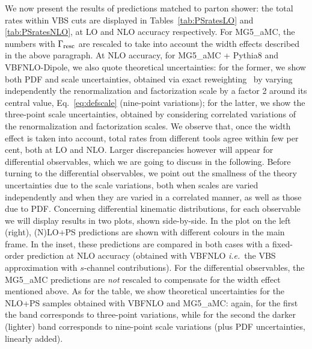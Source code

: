 We now present the results of predictions matched to parton shower: the total rates within VBS cuts are displayed in Tables~\ref{tab:PSratesLO} and
\ref{tab:PSratesNLO}, at LO and NLO
accuracy respectively. For {\sc MG5\_aMC}, 
the numbers with $\Gamma_{\rm resc}$ are rescaled to 
take into account the width effects described in the above paragraph. At NLO accuracy, for {\sc MG5\_aMC} + {\sc Pythia8} and {\sc VBFNLO}-{\sc Dipole}, we also quote
theoretical uncertainties: for the former, we show both PDF and scale uncertainties, obtained via exact reweighting~\cite{Frederix:2011ss} by varying independently the renormalization and factorization
scale by a factor 2 around its central value, Eq.~\ref{eq:defscale} (nine-point variations); for the latter, we show the 
three-point scale uncertainties, obtained by considering correlated variations of the renormalization and factorization scales. 
We observe that, once the width effect is taken into
account, total rates from different tools agree within few per cent, both at LO and NLO. Larger discrepancies however will appear for differential observables, which we are going to discuss in
the following. Before turning to the differential observables, we point out the smallness of the theory uncertainties due to the scale variations, both when
scales are varied independently and when they are varied in a correlated manner, as well as those due to PDF.  
Concerning differential kinematic distributions, for each observable we will display results in two plots, shown side-by-side. In the plot on the left (right), (N)LO+PS predictions are shown
with different colours in the main frame. In the inset, these predictions are compared in both cases with a fixed-order prediction at NLO accuracy (obtained with
{\sc VBFNLO} \emph{i.e.}\ the VBS approximation with $s$-channel contributions). For the differential observables, the {\sc MG5\_aMC} predictions are \emph{not} rescaled to compensate for the width effect mentioned above. As for the table, we show theoretical uncertainties for the NLO+PS samples
obtained with {\sc VBFNLO} and {\sc MG5\_aMC}: 
again, for the first the band corresponds to three-point variations, while for the second the darker (lighter) band corresponds to nine-point 
scale variations (plus PDF uncertainties, linearly added). 

